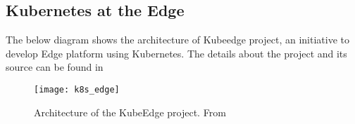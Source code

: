\subsection{Kubernetes at the Edge}

\begin{flushleft}
The below diagram shows the architecture of Kubeedge project, an initiative to develop Edge platform using Kubernetes. The details about the project and its source can be found in \cite{kubeedge}
\end{flushleft}

\begin{figure}
    \centering
    \texttt{[image: k8s\_edge]}
    \label{fig:figure14}
    \caption{Architecture of the KubeEdge project. From \cite[What is Kubeedge]{kubeedgedoc}}
\end{figure}


